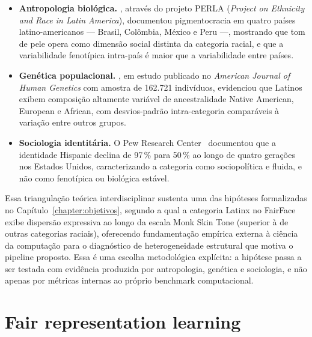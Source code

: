 \begin{itemize}
\item \textbf{Antropologia biológica.} , através do projeto PERLA (\emph{Project on Ethnicity and Race in Latin America}), documentou pigmentocracia em quatro países latino-americanos --- Brasil, Colômbia, México e Peru ---, mostrando que tom de pele opera como dimensão social distinta da categoria racial, e que a variabilidade fenotípica intra-país é maior que a variabilidade entre países.

\item \textbf{Genética populacional.} , em estudo publicado no \emph{American Journal of Human Genetics} com amostra de 162.721 indivíduos, evidenciou que Latinos exibem composição altamente variável de ancestralidade Native American, European e African, com desvios-padrão intra-categoria comparáveis à variação entre outros grupos.

\item \textbf{Sociologia identitária.} O Pew Research Center~\cite{lopez2017hispanic} documentou que a identidade Hispanic declina de 97\,\% para 50\,\% ao longo de quatro gerações nos Estados Unidos, caracterizando a categoria como sociopolítica e fluida, e não como fenotípica ou biológica estável.
\end{itemize}

Essa triangulação teórica interdisciplinar sustenta uma das hipóteses formalizadas no Capítulo~\ref{chapter:objetivos}, segundo a qual a categoria Latinx no FairFace exibe dispersão expressiva ao longo da escala Monk Skin Tone (superior à de outras categorias raciais), oferecendo fundamentação empírica externa à ciência da computação para o diagnóstico de heterogeneidade estrutural que motiva o pipeline proposto. Essa é uma escolha metodológica explícita: a hipótese passa a ser testada com evidência produzida por antropologia, genética e sociologia, e não apenas por métricas internas ao próprio benchmark computacional.

\section{Fair representation learning}
\label{sec:rl_fairrep}

